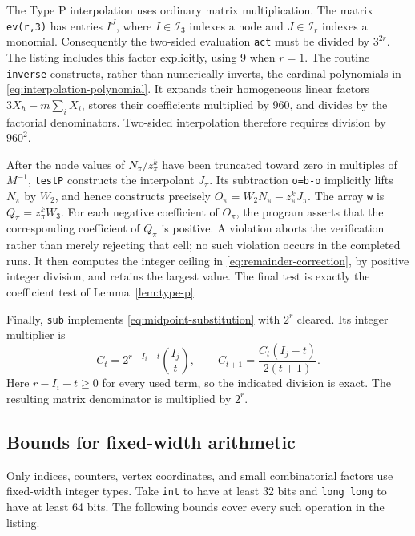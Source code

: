 The Type P interpolation uses ordinary matrix multiplication.  The matrix
\texttt{ev(r,3)} has entries $I^J$, where $I\in\mathcal I_3$ indexes a
node and $J\in\mathcal I_r$ indexes a monomial.  Consequently the two-sided
evaluation \texttt{act} must be divided by $3^{2r}$.  The listing includes
this factor explicitly, using 9 when $r=1$.  The routine \texttt{inverse}
constructs, rather than numerically inverts, the cardinal polynomials
in \eqref{eq:interpolation-polynomial}.  It expands their homogeneous
linear factors $3X_h-m\sum_iX_i$, stores their coefficients multiplied by
960, and divides by the factorial denominators.  Two-sided interpolation
therefore requires division by $960^2$.

After the node values of $N_\pi/z_\pi^k$ have been truncated toward zero in
multiples of $M^{-1}$, \texttt{testP} constructs the interpolant $J_\pi$.
Its subtraction \texttt{o=b-o} implicitly lifts $N_\pi$ by $W_2$, and hence
constructs precisely $O_\pi=W_2N_\pi-z_\pi^kJ_\pi$.
The array \texttt{w} is $Q_\pi=z_\pi^kW_3$.  For each negative coefficient
of $O_\pi$, the program asserts that the corresponding coefficient of
$Q_\pi$ is positive.  A violation aborts the verification rather than
merely rejecting that cell; no such violation occurs in the completed
runs.  It then computes the integer ceiling in
\eqref{eq:remainder-correction}, by positive integer division, and retains
the largest value.  The final test is exactly the coefficient test of
Lemma~\ref{lem:type-p}.

Finally, \texttt{sub} implements \eqref{eq:midpoint-substitution} with
$2^r$ cleared.  Its integer multiplier is
\begin{equation}\label{eq:cleared-substitution}
 C_t=2^{r-I_i-t}\binom{I_j}{t},\qquad
 C_{t+1}=\frac{C_t(I_j-t)}{2(t+1)}.
\end{equation}
Here $r-I_i-t\ge0$ for every used term, so the indicated division is exact.
The resulting matrix denominator is multiplied by $2^r$.

\subsection{Bounds for fixed-width arithmetic}

Only indices, counters, vertex coordinates, and small combinatorial factors use
fixed-width integer types.  Take \texttt{int} to have at least 32 bits and
\texttt{long long} to have at least 64 bits.  The following bounds cover
every such operation in the listing.

